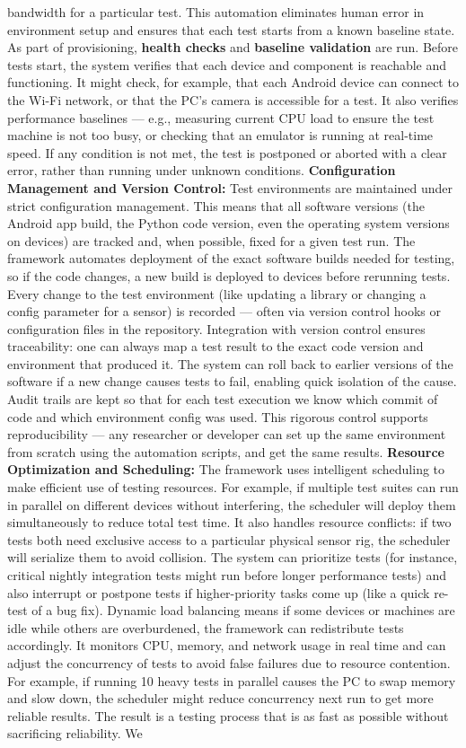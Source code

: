 bandwidth for a particular test. This automation eliminates human error in environment setup and ensures that each test starts from a known baseline state. As part of provisioning, \textbf{health checks} and \textbf{baseline validation} are run. Before tests start, the system verifies that each device and component is reachable and functioning. It might check, for example, that each Android device can connect to the Wi-Fi network, or that the PC's camera is accessible for a test. It also verifies performance baselines --- e.g., measuring current CPU load to ensure the test machine is not too busy, or checking that an emulator is running at real-time speed. If any condition is not met, the test is postponed or aborted with a clear error, rather than running under unknown conditions. \textbf{Configuration Management and Version Control:} Test environments are maintained under strict configuration management. This means that all software versions (the Android app build, the Python code version, even the operating system versions on devices) are tracked and, when possible, fixed for a given test run. The framework automates deployment of the exact software builds needed for testing, so if the code changes, a new build is deployed to devices before rerunning tests. Every change to the test environment (like updating a library or changing a config parameter for a sensor) is recorded --- often via version control hooks or configuration files in the repository. Integration with version control ensures traceability: one can always map a test result to the exact code version and environment that produced it. The system can roll back to earlier versions of the software if a new change causes tests to fail, enabling quick isolation of the cause. Audit trails are kept so that for each test execution we know which commit of code and which environment config was used. This rigorous control supports reproducibility --- any researcher or developer can set up the same environment from scratch using the automation scripts, and get the same results. \textbf{Resource Optimization and Scheduling:} The framework uses intelligent scheduling to make efficient use of testing resources. For example, if multiple test suites can run in parallel on different devices without interfering, the scheduler will deploy them simultaneously to reduce total test time. It also handles resource conflicts: if two tests both need exclusive access to a particular physical sensor rig, the scheduler will serialize them to avoid collision. The system can prioritize tests (for instance, critical nightly integration tests might run before longer performance tests) and also interrupt or postpone tests if higher-priority tasks come up (like a quick re-test of a bug fix). Dynamic load balancing means if some devices or machines are idle while others are overburdened, the framework can redistribute tests accordingly. It monitors CPU, memory, and network usage in real time and can adjust the concurrency of tests to avoid false failures due to resource contention. For example, if running 10 heavy tests in parallel causes the PC to swap memory and slow down, the scheduler might reduce concurrency next run to get more reliable results. The result is a testing process that is as fast as possible without sacrificing reliability. We 